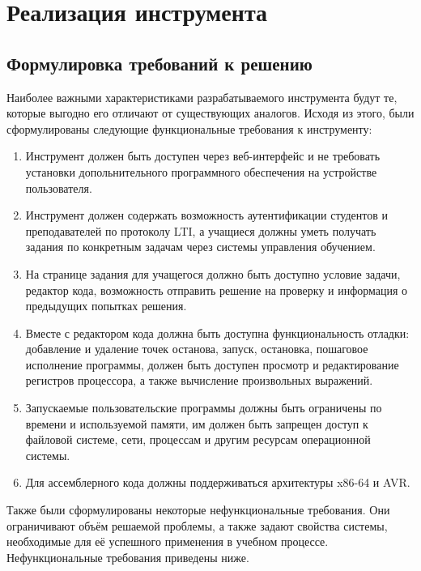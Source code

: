 \documentclass[a4paper,article,14pt]{extarticle}
\begin{document}
\pagebreak
\section{Реализация инструмента}

\subsection{Формулировка требований к решению}

Наиболее важными характеристиками разрабатываемого инструмента будут те, которые выгодно его отличают от существующих аналогов. Исходя из этого, были сформулированы следующие функциональные требования к инструменту:

\begin{enumerate}
    \item Инструмент должен быть доступен через веб-интерфейс и не требовать установки допольнительного программного обеспечения на устройстве пользователя.
    \item Инструмент должен содержать возможность аутентификации студентов и преподавателей по протоколу LTI, а учащиеся должны уметь получать задания по конкретным задачам через системы управления обучением.
    \item На странице задания для учащегося должно быть доступно условие задачи, редактор кода, возможность отправить решение на проверку и информация о предыдущих попытках решения.
    \item Вместе с редактором кода должна быть доступна функциональность отладки: добавление и удаление точек останова, запуск, остановка, пошаговое исполнение программы, должен быть доступен просмотр и редактирование регистров процессора, а также вычисление произвольных выражений.
    \item Запускаемые пользовательские программы должны быть ограничены по времени и используемой памяти, им должен быть запрещен доступ к файловой системе, сети, процессам и другим ресурсам операционной системы.
    \item Для ассемблерного кода должны поддерживаться архитектуры x86-64 и AVR.
\end{enumerate}

Также были сформулированы некоторые нефункциональные требования. Они ограничивают объём решаемой проблемы, а также задают свойства системы, необходимые для её успешного применения в учебном процессе. Нефункциональные требования приведены ниже.
\end{document}
